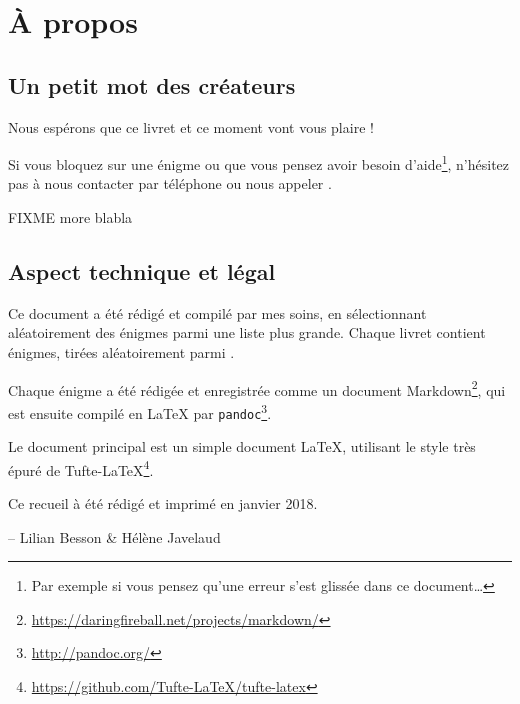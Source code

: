 \chapter{À propos}

\section*{Un petit mot des créateurs}

Nous espérons que ce livret et ce moment vont vous plaire !

Si vous bloquez sur une énigme ou que vous pensez avoir besoin d'aide\footnote{Par exemple si vous pensez qu'une erreur s'est glissée dans ce document…}, n'hésitez pas à nous contacter par téléphone ou nous appeler
.

FIXME more blabla


\section*{Aspect technique et légal}
Ce document a été rédigé et compilé par mes soins, en sélectionnant aléatoirement des énigmes parmi une liste plus grande.
Chaque livret contient \nbenigmes{} énigmes, tirées aléatoirement parmi \totalnbenigmes.

Chaque énigme a été rédigée et enregistrée comme un document Markdown\footnote{\url{https://daringfireball.net/projects/markdown/}},
qui est ensuite compilé en \LaTeX{} par \texttt{pandoc}\footnote{\url{http://pandoc.org/}}.

Le document principal est un simple document \LaTeX,
utilisant le style très épuré de Tufte-\LaTeX{}\footnote{\url{https://github.com/Tufte-LaTeX/tufte-latex}}.

Ce recueil à été rédigé et imprimé en janvier 2018.

-- Lilian Besson \& Hélène Javelaud